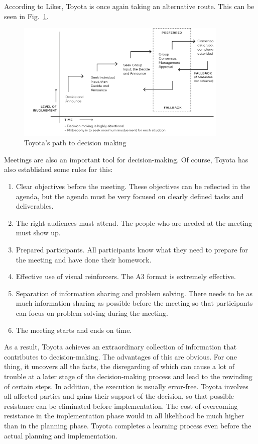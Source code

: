 \documentclass[a4paper,11pt]{article}
\begin{document}
According to Liker, Toyota is once again taking an alternative route. This can
be seen in Fig.~\ref{Entscheidung}.

\begin{figure}[h] 
  \centering
     \includegraphics[width=0.9\textwidth]{Entscheidung.png}
  \caption{Toyota's path to decision making}
  \label{Entscheidung}
\end{figure}

Meetings are also an important tool for decision-making. Of course, Toyota has
also established some rules for this:

\begin{enumerate}
\item Clear objectives before the meeting. These objectives can be reflected
  in the agenda, but the agenda must be very focused on clearly defined tasks
  and deliverables.
\item The right audiences must attend. The people who are needed at the
  meeting must show up.
\item Prepared participants. All participants know what they need to prepare
  for the meeting and have done their homework.
\item Effective use of visual reinforcers. The A3 format is extremely
  effective.
\item Separation of information sharing and problem solving. There needs to be
  as much information sharing as possible before the meeting so that
  participants can focus on problem solving during the meeting.
\item The meeting starts and ends on time.
\end{enumerate}

As a result, Toyota achieves an extraordinary collection of information that
contributes to decision-making. The advantages of this are obvious. For one
thing, it uncovers all the facts, the disregarding of which can cause a lot of
trouble at a later stage of the decision-making process and lead to the
rewinding of certain steps. In addition, the execution is usually
error-free. Toyota involves all affected parties and gains their support of
the decision, so that possible resistance can be eliminated before
implementation. The cost of overcoming resistance in the implementation phase
would in all likelihood be much higher than in the planning phase. Toyota
completes a learning process even before the actual planning and
implementation.
\end{document}
